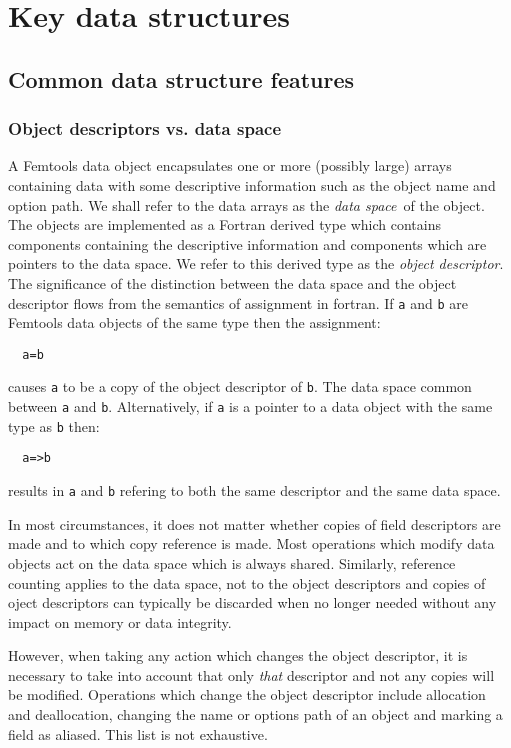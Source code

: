 \documentclass[a4paper, 11pt]{book}
\begin{document}
\part{Key data structures}

\chapter{Common data structure features}

\section{Object descriptors vs. data space}

A Femtools data object encapsulates one or more (possibly large) arrays
containing data with some descriptive information such as the object name
and option path. We shall refer to the data arrays as the \emph{data space}\
of the object. The objects are implemented as a Fortran derived type which
contains components containing the descriptive information and components
which are pointers to the data space. We refer to this derived type as the
\emph{object descriptor}. The significance of the distinction between the
data space and the object descriptor flows from the semantics of assignment
in fortran. If \lstinline+a+ and \lstinline+b+ are Femtools data objects of
the same type then the assignment:
\begin{lstlisting}
  a=b
\end{lstlisting}
causes \lstinline+a+ to be a copy of the object descriptor of \lstinline+b+.
The data space common between \lstinline+a+ and
\lstinline+b+. Alternatively, if \lstinline+a+ is a pointer to a data object
with the same type as \lstinline+b+ then:
\begin{lstlisting}
  a=>b
\end{lstlisting}
results in \lstinline+a+ and \lstinline+b+ refering to both the same
descriptor and the same data space.

In most circumstances, it does not matter whether copies of field
descriptors are made and to which copy reference is made. Most operations
which modify data objects act on the data space which is always
shared. Similarly, reference counting applies to the data space, not to the
object descriptors and copies of oject descriptors can typically be
discarded when no longer needed without any impact on memory or data
integrity.

However, when taking any action which changes the object descriptor, it is
necessary to take into account that only \emph{that} descriptor and not any
copies will be modified. Operations which change the object descriptor
include allocation and deallocation, changing the name or options path of an
object and marking a field as aliased. This list is not exhaustive.
\end{document}
